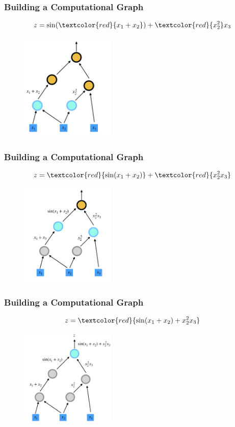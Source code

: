 \documentclass{beamer}
\newcommand{\red}[1]{\textcolor{red}{#1}}
\begin{document}
\begin{frame}
	\frametitle{Building a Computational Graph}
	
	$$z=\sin(\red{x_1+x_2}) + \red{x_2^2}x_3$$
	
	\begin{figure}[hbt]
  \includegraphics[width=0.4\textwidth]{figures/fd1}
\end{figure}

	
\end{frame}


\begin{frame}
	\frametitle{Building a Computational Graph}
	
	$$z=\red{\sin(x_1+x_2)} + \red{x_2^2x_3}$$
	
	\begin{figure}[hbt]
  \includegraphics[width=0.4\textwidth]{figures/fd2}
\end{figure}
\end{frame}

\begin{frame}
	\frametitle{Building a Computational Graph}
	
	$$z=\red{\sin(x_1+x_2) + x_2^2x_3}$$
	
	\begin{figure}[hbt]
  \includegraphics[width=0.4\textwidth]{figures/fd3}
\end{figure}
\end{frame}
\end{document}
